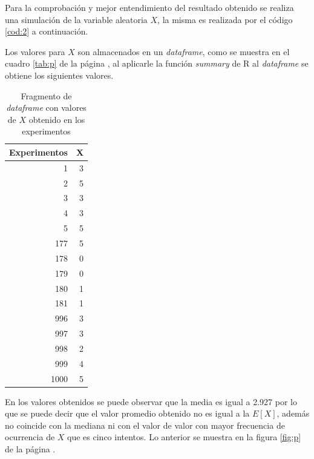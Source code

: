 \documentclass{article}
\begin{document}
Para la comprobación y mejor entendimiento del resultado obtenido se realiza una simulación de la variable aleatoria $X$, la misma es realizada por el código \ref{cod:2} a continuación.
\begin{center}

\label{cod:2}
\end{center}
Los valores para $X$ son almacenados en un \textit{dataframe}, como se muestra en el cuadro \ref{tab:p} de la página \pageref{tab:p}, al aplicarle la función \textit{summary} de R al \textit{dataframe} se obtiene los siguientes valores.  

\begin{table}[H]
  \centering
  \caption{Fragmento de \textit{dataframe} con valores de $X$ obtenido en los experimentos}
    \begin{tabular}{rr}
    \toprule
    \multicolumn{1}{l}{Experimentos} & \multicolumn{1}{c}{X} \\
    \midrule
    1     & 3 \\
    2     & 5 \\
    3     & 3 \\
    4     & 3 \\
    5     & 5 \\
    177   & 5 \\
    178   & 0 \\
    179   & 0 \\
    180   & 1 \\
    181   & 1 \\
    996   & 3 \\
    997   & 3 \\
    998   & 2 \\
    999   & 4 \\
    1000  & 5 \\
    \bottomrule
    \end{tabular}%
  \label{tab:addlabel}%
\end{table}%

En los valores obtenidos se puede observar que la media es igual a 2.927 por lo que se puede decir que el valor promedio obtenido no es igual a la $E[X]$, además no coincide con la mediana ni con el valor de valor con mayor frecuencia de ocurrencia de $X$ que es cinco intentos. Lo anterior se muestra en la figura \ref{fig:p} de la página \pageref{fig:p}.
\end{document}
